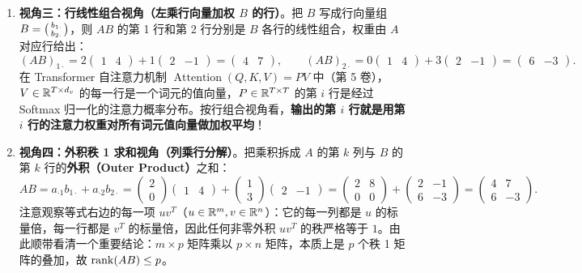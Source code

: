 \begin{enumerate}
  \item \textbf{视角三：行线性组合视角（左乘行向量加权 $B$ 的行）}。把 $B$ 写成行向量组 $B = \begin{psmallmatrix} b_{1\cdot} \\ b_{2\cdot} \end{psmallmatrix}$，则 $AB$ 的第 1 行和第 2 行分别是 $B$ 各行的线性组合，权重由 $A$ 对应行给出：
  \[
  (AB)_{1\cdot} = 2\begin{pmatrix}1 & 4\end{pmatrix} + 1\begin{pmatrix}2 & -1\end{pmatrix} = \begin{pmatrix}4 & 7\end{pmatrix}, \qquad
  (AB)_{2\cdot} = 0\begin{pmatrix}1 & 4\end{pmatrix} + 3\begin{pmatrix}2 & -1\end{pmatrix} = \begin{pmatrix}6 & -3\end{pmatrix}.
  \]
  在 Transformer 自注意力机制 $\operatorname{Attention}(Q,K,V) = P V$ 中（第 5 卷），$V \in \mathbb{R}^{T \times d_v}$ 的每一行是一个词元的值向量，$P \in \mathbb{R}^{T \times T}$ 的第 $i$ 行是经过 Softmax 归一化的注意力概率分布。按行组合视角看，\textbf{输出的第 $i$ 行就是用第 $i$ 行的注意力权重对所有词元值向量做加权平均}！

  \item \textbf{视角四：外积秩 1 求和视角（列乘行分解）}。把乘积拆成 $A$ 的第 $k$ 列与 $B$ 的第 $k$ 行的\textbf{外积（Outer Product）}之和：
  \[
  AB = a_{\cdot 1} b_{1\cdot} + a_{\cdot 2} b_{2\cdot}
  = \begin{pmatrix}2\\0\end{pmatrix}\begin{pmatrix}1 & 4\end{pmatrix}
  + \begin{pmatrix}1\\3\end{pmatrix}\begin{pmatrix}2 & -1\end{pmatrix}
  = \begin{pmatrix}2 & 8\\0 & 0\end{pmatrix}
  + \begin{pmatrix}2 & -1\\6 & -3\end{pmatrix}
  = \begin{pmatrix}4 & 7\\6 & -3\end{pmatrix}.
  \]
  注意观察等式右边的每一项 $u v^T$（$u \in \mathbb{R}^m, v \in \mathbb{R}^n$）：它的每一列都是 $u$ 的标量倍，每一行都是 $v^T$ 的标量倍，因此任何非零外积 $uv^T$ 的秩严格等于 $1$。由此顺带看清一个重要结论：$m \times p$ 矩阵乘以 $p \times n$ 矩阵，本质上是 $p$ 个秩 1 矩阵的叠加，故 $\operatorname{rank}(AB) \le p$。
\end{enumerate}

